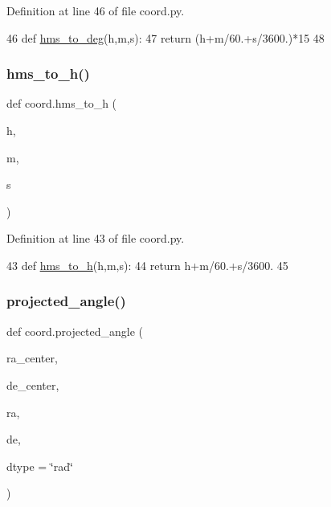 Definition at line 46 of file coord.\+py.


\begin{DoxyCode}
46 \textcolor{keyword}{def }\hyperlink{namespacecoord_ac3ec31a56901971ab03a578d64030901}{hms\_to\_deg}(h,m,s):
47     \textcolor{keywordflow}{return} (h+m/60.+s/3600.)*15
48 
\end{DoxyCode}
\mbox{\label{namespacecoord_a07f644bbf8451a0560cf4b4966049ab0}} 
\subsubsection{\texorpdfstring{hms\+\_\+to\+\_\+h()}{hms\_to\_h()}}
{\footnotesize\ttfamily def coord.\+hms\+\_\+to\+\_\+h (\begin{DoxyParamCaption}\item[{}]{h,  }\item[{}]{m,  }\item[{}]{s }\end{DoxyParamCaption})}



Definition at line 43 of file coord.\+py.


\begin{DoxyCode}
43 \textcolor{keyword}{def }\hyperlink{namespacecoord_a07f644bbf8451a0560cf4b4966049ab0}{hms\_to\_h}(h,m,s):
44     \textcolor{keywordflow}{return} h+m/60.+s/3600.
45 
\end{DoxyCode}
\mbox{\label{namespacecoord_a04a9b47f67924315930327ed806ee648}} 
\subsubsection{\texorpdfstring{projected\+\_\+angle()}{projected\_angle()}}
{\footnotesize\ttfamily def coord.\+projected\+\_\+angle (\begin{DoxyParamCaption}\item[{}]{ra\+\_\+center,  }\item[{}]{de\+\_\+center,  }\item[{}]{ra,  }\item[{}]{de,  }\item[{}]{dtype = {\ttfamily \char`\"{}rad\char`\"{}} }\end{DoxyParamCaption})}

